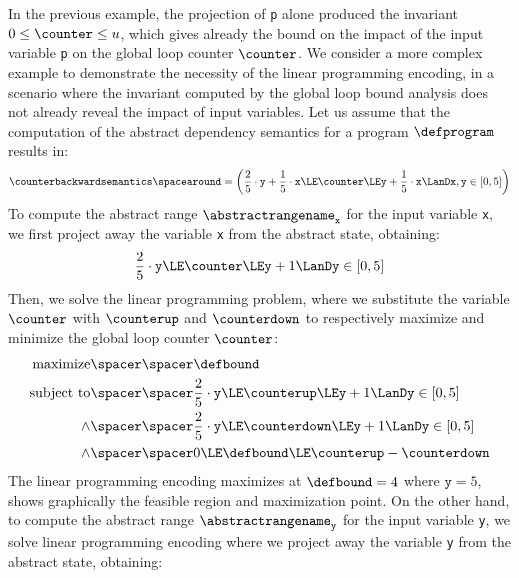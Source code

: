 \begin{example}
  In the previous example, the projection of \texttt{p} alone produced the invariant $0 \le \counter \le u$, which gives already the bound on the impact of the input variable \texttt{p} on the global loop counter $\counter$.
  We consider a more complex example to demonstrate the necessity of the linear programming encoding, in a scenario where the invariant computed by the global loop bound analysis does not already reveal the impact of input variables.
  Let us assume that the computation of the abstract dependency semantics for a program $\defprogram$ results in:
  \begin{align*}
    \counterbackwardsemantics \spacearound=\left(\frac{2}{5}\cdot\texttt{y}+\frac{1}{5}\cdot\texttt{x} \LE \counter \LE \texttt{y} + \frac{1}{5}\cdot\texttt{x} \LanD \texttt{x}, \texttt{y} \in [0, 5]\right)
  \end{align*}
  To compute the abstract range $\abstractrangename_{\texttt{x}}$ for the input variable \texttt{x}, we first project away the variable \texttt{x} from the abstract state, obtaining:
  \begin{align*}
    \frac{2}{5}\cdot\texttt{y} \LE \counter \LE \texttt{y}+1 \LanD \texttt{y} \in [0, 5]
  \end{align*}
  Then, we solve the linear programming problem, where we substitute the variable $\counter$ with $\counterup$ and $\counterdown$ to respectively maximize and minimize the global loop counter $\counter$:
  \begin{align*}
    \text{maximize} \spacer\spacer& \defbound \\
    \text{subject to} \spacer\spacer & \frac{2}{5}\cdot\texttt{y} \LE \counterup \LE \texttt{y}+1 \LanD \texttt{y} \in [0, 5] \\
    \land\spacer\spacer& \frac{2}{5}\cdot\texttt{y} \LE \counterdown \LE \texttt{y}+1 \LanD \texttt{y} \in [0, 5] \\
    \land\spacer\spacer& 0 \LE \defbound \LE \counterup - \counterdown
  \end{align*}
  The linear programming encoding maximizes at $\defbound=4$ where $\texttt{y} = 5$,  shows graphically the feasible region and maximization point.
  On the other hand, to compute the abstract range $\abstractrangename_{\texttt{y}}$ for the input variable \texttt{y}, we solve linear programming encoding where we project away the variable \texttt{y} from the abstract state, obtaining:

\end{example}
